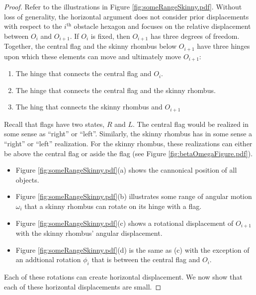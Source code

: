 \documentclass[10pt]{CSUNthesis}
\theoremstyle{plain}%
\theoremstyle{definition}
\theoremstyle{remark}
\newcommand{\ith}{i^\text{th}}
\begin{document}
\begin{proof}
Refer to the illustrations in Figure \ref{fig:someRangeSkinny.pdf}.  
Without loss of generality, the horizontal argument does not consider prior displacements with respect to the $\ith$ obstacle hexagon and focuses on the relative displacement between $O_{i}$ and $O_{i+1}$.  
If $O_i$ is fixed, then $O_{i+1}$ has three degrees of freedom.  
Together, the central flag and the skinny rhombus below $O_{i+1}$ have three hinges upon which these elements can move and ultimately move $O_{i+1}$:
\begin{enumerate}
\item The hinge that connects the central flag and $O_i$.
\item The hinge that connects the central flag and the skinny rhombus.
\item The hing that connects the skinny rhombus and $O_{i+1}$
\end{enumerate}
Recall that flags have two states, $R$ and $L$.  
The central flag would be realized in some sense as ``right'' or ``left''.   
Similarly, the skinny rhombus has in some sense a ``right'' or ``left'' realization.  
For the skinny rhombus, these realizations can either be above the central flag  or aside the flag (see Figure \ref{fig:betaOmegaFigure.pdf}).  
\begin{itemize}
\item Figure \ref{fig:someRangeSkinny.pdf}(a) shows the cannonical position of all objects.  
\item Figure \ref{fig:someRangeSkinny.pdf}(b) illustrates some range of angular motion $\omega_i$ that a skinny rhombus can rotate on its hinge with a flag.  
\item Figure \ref{fig:someRangeSkinny.pdf}(c) shows a rotational displacement of $O_{i+1}$ with the skinny rhombus' angular displacement.
\item Figure \ref{fig:someRangeSkinny.pdf}(d) is the same as (c) with the exception of an addtional rotation $\phi_i$ that is between the central flag and $O_i$.   
\end{itemize}
Each of these rotations can create horizontal displacement.  
We now show that each of these horizontal displacements are small.

\end{proof}
\end{document}
